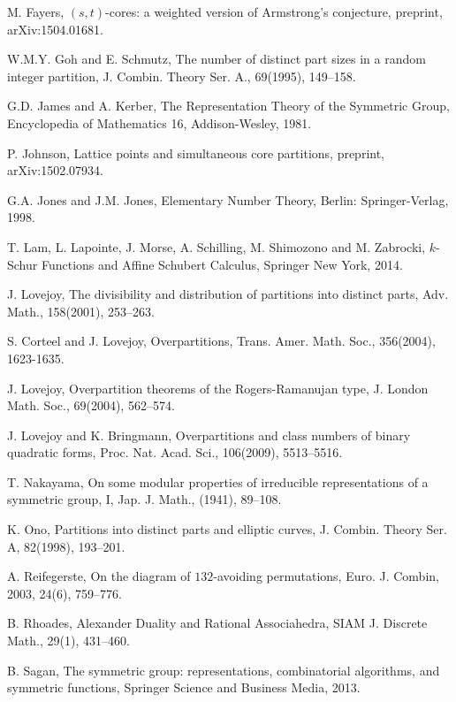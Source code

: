\documentclass[a4paper,12pt]{article}
\begin{document}
\begin{thebibliography}{99}
M. Fayers, $(s,t)$-cores: a weighted version of Armstrong's conjecture, preprint, arXiv:1504.01681.

W.M.Y. Goh and E. Schmutz, The number of distinct part sizes in a random integer partition,
J. Combin. Theory Ser. A., 69(1995), 149--158.

G.D. James and A. Kerber,  The Representation Theory of the Symmetric Group,
Encyclopedia of Mathematics 16, Addison-Wesley, 1981.

P. Johnson, Lattice points and simultaneous core partitions, preprint, arXiv:1502.07934.

G.A. Jones and  J.M. Jones, Elementary Number Theory, Berlin: Springer-Verlag, 1998.

T. Lam, L. Lapointe, J. Morse, A. Schilling, M. Shimozono and M. Zabrocki, $k$-Schur Functions and Affine Schubert Calculus, Springer New York, 2014.

J. Lovejoy,  The divisibility and distribution of partitions into distinct parts,
Adv. Math., 158(2001), 253--263.

S. Corteel and J.  Lovejoy, Overpartitions, Trans. Amer. Math. Soc., 356(2004), 1623-1635.

J. Lovejoy,  Overpartition theorems of the Rogers-Ramanujan type, J. London Math. Soc., 69(2004), 562--574.

J. Lovejoy and K. Bringmann,  Overpartitions and class numbers of binary quadratic forms, Proc. Nat. Acad. Sci., 106(2009), 5513--5516.

T. Nakayama, On some modular properties of irreducible representations of a symmetric group, I,  Jap. J. Math., (1941), 89--108.


K. Ono, Partitions into distinct parts and elliptic curves, J. Combin. Theory Ser. A, 82(1998), 193--201.

A. Reifegerste, On the diagram of $132$-avoiding permutations,
Euro. J. Combin, 2003, 24(6), 759--776.


B. Rhoades, Alexander Duality and Rational Associahedra,
SIAM J. Discrete Math., 29(1), 431--460.




B. Sagan, The symmetric group: representations, combinatorial algorithms, and symmetric functions, Springer Science and Business Media, 2013.


\end{thebibliography}
\end{document}
